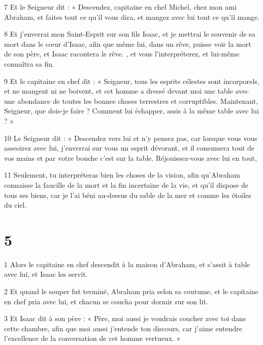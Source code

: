 \par 7 Et le Seigneur dit : « Descendez, capitaine en chef Michel, chez mon ami Abraham, et faites tout ce qu'il vous dira, et mangez avec lui tout ce qu'il mange.

\par 8 Et j'enverrai mon Saint-Esprit sur son fils Isaac, et je mettrai le souvenir de sa mort dans le cœur d'Isaac, afin que même lui, dans un rêve, puisse voir la mort de son père, et Isaac racontera le rêve. , et vous l’interpréterez, et lui-même connaîtra sa fin.

\par 9 Et le capitaine en chef dit : « Seigneur, tous les esprits célestes sont incorporels, et ne mangent ni ne boivent, et cet homme a dressé devant moi une table avec une abondance de toutes les bonnes choses terrestres et corruptibles. Maintenant, Seigneur, que dois-je faire ? Comment lui échapper, assis à la même table avec lui ? »

\par 10 Le Seigneur dit : « Descendez vers lui et n'y pensez pas, car lorsque vous vous asseoirez avec lui, j'enverrai sur vous un esprit dévorant, et il consumera tout de vos mains et par votre bouche c'est sur la table. Réjouissez-vous avec lui en tout,

\par 11 Seulement, tu interpréteras bien les choses de la vision, afin qu'Abraham connaisse la faucille de la mort et la fin incertaine de la vie, et qu'il dispose de tous ses biens, car je l'ai béni au-dessus du sable de la mer et comme les étoiles du ciel.

\chapter{5}

\par 1 Alors le capitaine en chef descendit à la maison d'Abraham, et s'assit à table avec lui, et Isaac les servit.

\par 2 Et quand le souper fut terminé, Abraham pria selon sa coutume, et le capitaine en chef pria avec lui, et chacun se coucha pour dormir sur son lit.

\par 3 Et Isaac dit à son père : « Père, moi aussi je voudrais coucher avec toi dans cette chambre, afin que moi aussi j'entende ton discours, car j'aime entendre l'excellence de la conversation de cet homme vertueux. »

